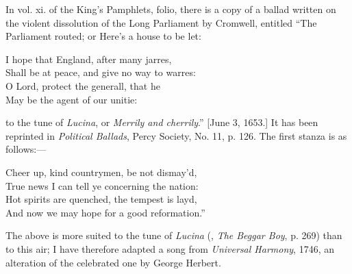 In vol. xi. of the King’s Pamphlets, folio, there is a copy of a ballad written on
the violent dissolution of the Long Parliament by Cromwell, entitled “The Parliament
routed; or Here’s a house to be let:
\settowidth{\versewidth}{Shall be at peace, and give no way to warres:}
\begin{scverse}I hope that England, after many jarres,\\
Shall be at peace, and give no way to warres:\\
O Lord, protect the generall, that he\\
May be the agent of our unitie:
\end{scverse}
to the tune of \textit{Lucina}, or \textit{Merrily and cherrily}.” [June 3, 1653.] It has been
reprinted in \textit{Political Ballads}, Percy Society, No. 11, p. 126. The first stanza
is as follows:—
\settowidth{\versewidth}{Hot spirits are quenched, the tempest is layd,}
\begin{scverse}\begin{altverse}
Cheer up, kind countrymen, be not dismay’d,\\
True news I can tell ye concerning the nation:\\
Hot spirits are quenched, the tempest is layd,\\
And now we may hope for a good reformation.”
\end{altverse}
\end{scverse}

The above is more suited to the tune of \textit{Lucina} (\ie, \textit{The Beggar Boy}, p. 269)
than to this air; I have therefore adapted a song from \textit{Universal Harmony}, 1746,
an alteration of the celebrated one by George Herbert.




